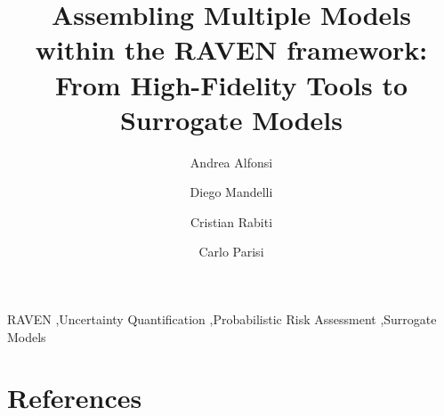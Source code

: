 \documentclass{elsarticle}
\begin{document}
\begin{frontmatter}

\title{Assembling Multiple Models within the RAVEN framework: From High-Fidelity Tools to Surrogate Models}

\author{Andrea Alfonsi}
\address{andrea.alfonsi@inl.gov}

\author{Diego Mandelli}
\address{diego.mandelli@inl.gov}

\author{Cristian Rabiti}
\address{cristian.rabiti@inl.gov}

\author{Carlo Parisi}
\address{carlo.parisi@inl.gov}

\begin{abstract}
  
\end{abstract}

\begin{keyword}
RAVEN \sep Uncertainty Quantification \sep Probabilistic Risk Assessment \sep Surrogate Models 
\end{keyword}

\end{frontmatter}

\linenumbers

\printnomenclature[1in]




\section*{References}


\end{document}
